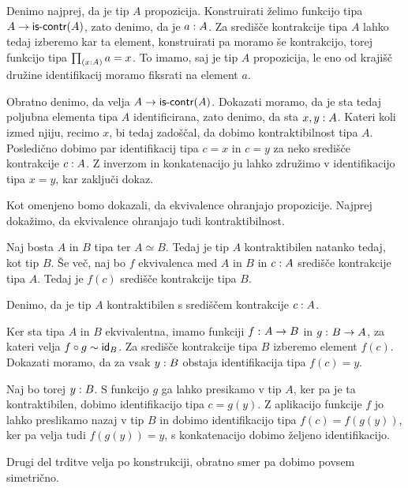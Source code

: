 \begin{dokaz}
  Denimo najprej, da je tip \(A\) propozicija. Konstruirati želimo funkcijo tipa \(A \to \textnormal{\textsf{is-contr}}(A)\), zato denimo, da je \(a : A\). Za središče kontrakcije tipa \(A\) lahko tedaj izberemo kar ta element, konstruirati pa moramo še kontrakcijo, torej funkcijo tipa \(\textstyle \prod_{\left( x : A \right)} a = x\). To imamo, saj je tip \(A\) propozicija, le eno od krajišč družine identifikacij moramo fiksrati na element \(a\).

  Obratno denimo, da velja \(A \to \textnormal{\textsf{is-contr}}(A)\). Dokazati moramo, da je sta tedaj poljubna elementa tipa \(A\) identificirana, zato denimo, da sta \(x, y : A\). Kateri koli izmed njiju, recimo \(x\), bi tedaj zadoščal, da dobimo kontraktibilnost tipa \(A\). Posledično dobimo par identifikacij tipa \(c = x\) in \(c = y\) za neko središče kontrakcije \(c : A\). Z inverzom in konkatenacijo ju lahko združimo v identifikacijo tipa \(x = y\), kar zaključi dokaz.
\end{dokaz}

Kot omenjeno bomo dokazali, da ekvivalence ohranjajo propozicije. Najprej dokažimo, da ekvivalence ohranjajo tudi kontraktibilnost.

\begin{trditev}
  \label{equiv-preserves-contr}
  Naj bosta \(A\) in \(B\) tipa ter \(A \simeq B\). Tedaj je tip \(A\) kontraktibilen natanko tedaj, kot tip \(B\). Še več, naj bo \(f\) ekvivalenca med \(A\) in \(B\) in \(c : A\) središče kontrakcije tipa \(A\). Tedaj je \(f(c)\) središče kontrakcije tipa \(B\).
\end{trditev}

\begin{dokaz}
  Denimo, da je tip \(A\) kontraktibilen s središčem kontrakcije \(c : A\).

  Ker sta tipa \(A\) in \(B\) ekvivalentna, imamo funkciji \(f \,\colon A \to B\) in
  \(g \,\colon B \to A\), za kateri velja \(f \circ g \sim \textnormal{\textsf{id}}_{B}\). Za središče kontrakcije tipa \(B\) izberemo element \(f(c)\). Dokazati moramo, da za vsak \(y : B\) obstaja identifikacija tipa \(f(c) = y\).

  Naj bo torej \(y : B\). S funkcijo \(g\) ga lahko presikamo v tip \(A\), ker pa je ta kontraktibilen, dobimo identifikacijo tipa \(c = g(y)\). Z aplikacijo funkcije \(f\) jo lahko preslikamo nazaj v tip \(B\) in dobimo identifikacijo tipa \(f(c) = f(g(y))\), ker pa velja tudi \(f(g(y)) = y\), s konkatenacijo dobimo željeno identifikacijo.

  Drugi del trditve velja po konstrukciji, obratno smer pa dobimo povsem simetrično.
\end{dokaz}

